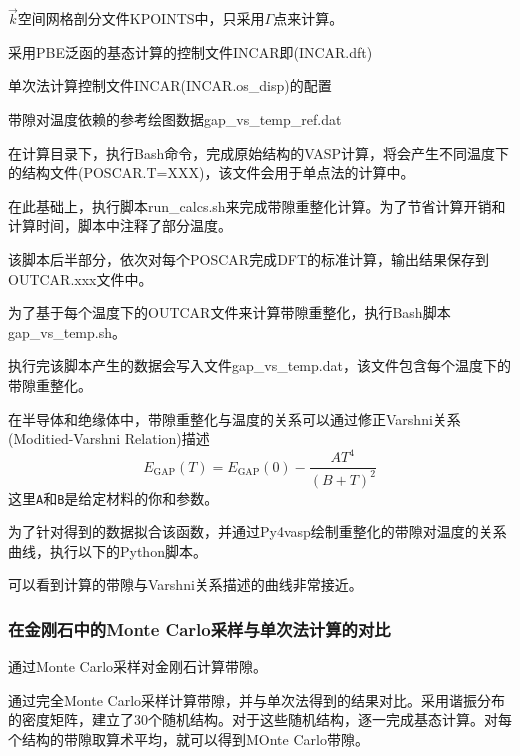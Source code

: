 {$\vec k$空间网格剖分文件\textrm{KPOINTS}中，只采用$\Gamma$点来计算。

采用\textrm{PBE}泛函的基态计算的控制文件\textrm{INCAR}即\textrm{(INCAR.dft)}

单次法计算控制文件\textrm{INCAR}\textrm{(INCAR.os\_disp)}的配置

带隙对温度依赖的参考绘图数据\textrm{gap\_vs\_temp\_ref.dat}

在计算目录下，执行\textrm{Bash}命令，完成原始结构的\textrm{VASP}计算，将会产生不同温度下的结构文件\textrm{(POSCAR.T=XXX)}，该文件会用于单点法的计算中。

在此基础上，执行脚本\textrm{run\_calcs.sh}来完成带隙重整化计算。为了节省计算开销和计算时间，脚本中注释了部分温度。

该脚本后半部分，依次对每个\textrm{POSCAR}完成\textrm{DFT}的标准计算，输出结果保存到\textrm{OUTCAR.xxx}文件中。

为了基于每个温度下的\textrm{OUTCAR}文件来计算带隙重整化，执行\textrm{Bash}脚本\textrm{gap\_vs\_temp.sh}。

执行完该脚本产生的数据会写入文件\textrm{gap\_vs\_temp.dat}，该文件包含每个温度下的带隙重整化。

在半导体和绝缘体中，带隙重整化与温度的关系可以通过修正\textrm{Varshni}关系\textrm{(Moditied-Varshni Relation)}描述
\begin{displaymath}
	E_{\mathrm{GAP}}(T)=E_{\mathrm{GAP}}(0)-\dfrac{AT^4}{(B+T)^2}
\end{displaymath}
这里\texttt{A}和\texttt{B}是给定材料的你和参数。

为了针对得到的数据拟合该函数，并通过\textrm{Py4vasp}绘制重整化的带隙对温度的关系曲线，执行以下的\textrm{Python}脚本。

可以看到计算的带隙与\textrm{Varshni}关系描述的曲线非常接近。%

\subsubsection{在金刚石中的\rm{Monte Carlo}采样与单次法计算的对比}
通过\textrm{Monte Carlo}采样对金刚石计算带隙。

通过完全\textrm{Monte Carlo}采样计算带隙，并与单次法得到的结果对比。采用谐振分布的密度矩阵，建立了30个随机结构。对于这些随机结构，逐一完成基态计算。对每个结构的带隙取算术平均，就可以得到\textrm{MOnte Carlo}带隙。

}
